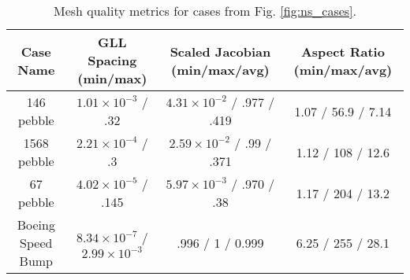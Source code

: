 \begin{table*} \footnotesize
\centering
\begin{tabular}{||c| c c c ||}
  \hline
  Case Name & GLL Spacing (min/max) & Scaled Jacobian (min/max/avg) & Aspect Ratio (min/max/avg)\\
  \hline \rule{0pt}{2.5ex}
  146 pebble
    &  $1.01\times 10^{-3}$ / .32
    & $4.31\times 10^{-2}$ / .977 / .419
    & 1.07 / 56.9 / 7.14 \\
  1568 pebble
    & $2.21\times 10^{-4}$ / .3
    & $2.59\times 10^{-2}$ / .99 / .371
    & 1.12 / 108 / 12.6 \\
  67 pebble
    & $4.02\times 10^{-5}$ / .145
    & $5.97\times 10^{-3}$ / .970 / .38
    & 1.17 / 204 / 13.2 \\
  Boeing Speed Bump
    & $8.34\times 10^{-7}$ / $2.99\times 10 ^{-3}$
    & .996 / 1 / 0.999
    & 6.25 / 255 / 28.1 \\
\hline
\end{tabular}
\vspace{-0.1cm}
\caption{
  \small
  Mesh quality metrics for cases from Fig. \ref{fig:ns_cases}.
  \label{table:mesh-metrics}
}
\end{table*}

%
%
%